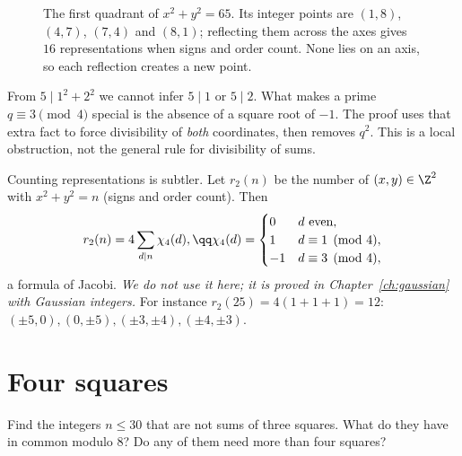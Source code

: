 \begin{figure}[ht]
\centering
{}
\caption{The first quadrant of $x^2+y^2=65$. Its integer points are $(1,8)$, $(4,7)$, $(7,4)$ and $(8,1)$; reflecting them across the axes gives $16$ representations when signs and order count. None lies on an axis, so each reflection creates a new point.}
\label{fig:sixtyfive}
\end{figure}

\begin{reminder}
From $5\mid1^2+2^2$ we cannot infer $5\mid1$ or $5\mid2$. What makes a prime $q\equiv3\pmod4$ special is the absence of a square root of $-1$. The proof uses that extra fact to force divisibility of \emph{both} coordinates, then removes $q^2$. This is a local obstruction, not the general rule for divisibility of sums.
\end{reminder}

Counting representations is subtler. Let $r_2(n)$ be the number of $(x,y)\in\Z^2$ with $x^2+y^2=n$ (signs and order count). Then
\[
\begin{gathered}r_2(n)=4\sum_{d\mid n}\chi_4(d),\qq\chi_4(d)=\begin{cases}0&d\text{ even},\\1&d\equiv1\pmod4,\\-1&d\equiv3\pmod4,\end{cases}\end{gathered}
\]
a formula of Jacobi. \emph{We do not use it here; it is proved in Chapter~\ref{ch:gaussian} with Gaussian integers.} For instance $r_2(25)=4(1+1+1)=12$: $(\pm5,0),(0,\pm5),(\pm3,\pm4),(\pm4,\pm3)$.

\section{Four squares}

\begin{think}
Find the integers $n\le30$ that are not sums of three squares. What do they have in common modulo $8$? Do any of them need more than four squares?
\end{think}

